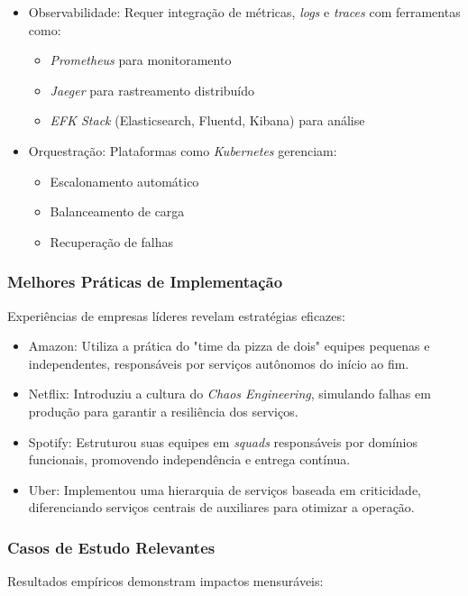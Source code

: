 \begin{itemize}
    \item Observabilidade: Requer integração de métricas, \textit{logs} e \textit{traces} com ferramentas como:
    \begin{itemize}
        \item \textit{Prometheus} para monitoramento
        \item \textit{Jaeger} para rastreamento distribuído
        \item \textit{EFK Stack} (Elasticsearch, Fluentd, Kibana) para análise
    \end{itemize}
    
    \item Orquestração: Plataformas como \textit{Kubernetes} gerenciam:
    \begin{itemize}
        \item Escalonamento automático
        \item Balanceamento de carga
        \item Recuperação de falhas
    \end{itemize}
\end{itemize}

\subsubsection{Melhores Práticas de Implementação}
Experiências de empresas líderes revelam estratégias eficazes:

\begin{itemize}
    \item Amazon: Utiliza a prática do "time da pizza de dois" equipes pequenas e independentes, responsáveis por serviços autônomos do início ao fim.
    
    \item Netflix: Introduziu a cultura do \textit{Chaos Engineering}, simulando falhas em produção para garantir a resiliência dos serviços.

    \item Spotify: Estruturou suas equipes em \textit{squads} responsáveis por domínios funcionais, promovendo independência e entrega contínua.

    \item Uber: Implementou uma hierarquia de serviços baseada em criticidade, diferenciando serviços centrais de auxiliares para otimizar a operação.
\end{itemize}

\subsubsection{Casos de Estudo Relevantes}
Resultados empíricos demonstram impactos mensuráveis:

